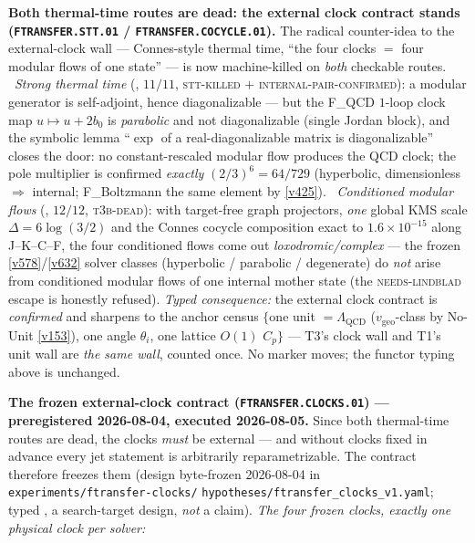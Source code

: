 \par\smallskip\noindent\textbf{Both thermal-time routes are dead: the
external clock contract stands (\texttt{FTRANSFER.STT.01} /
\texttt{FTRANSFER.COCYCLE.01}).}  The radical counter-idea to the
external-clock wall --- Connes-style thermal time, ``the four clocks
$=$ four modular flows of one state'' --- is now machine-killed on
\emph{both} checkable routes.  \mX\ \emph{Strong thermal time}
(, $11/11$,
\textsc{stt-killed} $+$ \textsc{internal-pair-confirmed}): a modular
generator is self-adjoint, hence diagonalizable --- but the F\_QCD
$1$-loop clock map $u\mapsto u+2b_0$ is \emph{parabolic} and not
diagonalizable (single Jordan block), and the symbolic lemma
``$\exp$ of a real-diagonalizable matrix is diagonalizable'' closes
the door: no constant-rescaled modular flow produces the QCD clock;
the pole multiplier is confirmed \emph{exactly} $(2/3)^6=64/729$
(hyperbolic, dimensionless $\Rightarrow$ internal; F\_Boltzmann the
same element by \vref{v425}).  \mX\ \emph{Conditioned modular flows}
(, $12/12$,
\textsc{t3b-dead}): with target-free graph projectors, \emph{one}
global KMS scale $\Delta=6\log(3/2)$ and the Connes cocycle
composition exact to $1.6\times10^{-15}$ along J--K--C--F, the four
conditioned flows come out \emph{loxodromic/complex} --- the frozen
\vref{v578}/\vref{v632} solver classes (hyperbolic / parabolic /
degenerate) do \emph{not} arise from conditioned modular flows of
one internal mother state (the \textsc{needs-lindblad} escape is
honestly refused).  \emph{Typed consequence:} the external clock
contract is \emph{confirmed} and sharpens to the anchor census
$\{$one unit $=\Lambda_{\mathrm{QCD}}$
($v_{\mathrm{geo}}$-class by No-Unit \vref{v153}), one angle
$\theta_i$, one lattice $O(1)$ $C_p\}$ --- T3's clock wall and T1's
unit wall are \emph{the same wall}, counted once.  No marker moves;
the functor typing above is unchanged.
\par\smallskip\noindent\textbf{The frozen external-clock contract
(\texttt{FTRANSFER.CLOCKS.01}) --- preregistered 2026-08-04,
executed 2026-08-05.}
Since both thermal-time routes are dead, the clocks \emph{must} be
external --- and without clocks fixed in advance every jet statement
is arbitrarily reparametrizable.  The contract therefore freezes
them (design byte-frozen 2026-08-04 in
\texttt{experiments/ftransfer-clocks/}\allowbreak
\texttt{hypotheses/ftransfer\_clocks\_v1.yaml};
typed \mX, a search-target design, \emph{not} a claim).  \emph{The
four frozen clocks, exactly one physical clock per solver:}
